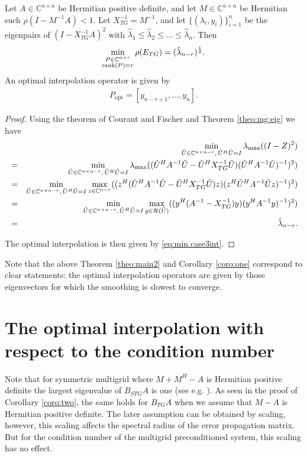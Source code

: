 \documentclass[final]{siamltex}
\newcommand{\innbCnnmr}{\in\mathbb{C}^{n\times n-r}}
\newcommand{\beqo}{\begin{eqnarray*}}
\newcommand{\beq}{\begin{eqnarray}}
\newcommand{\eeqo}{\end{eqnarray*}}
\newcommand{\eeq}{\end{eqnarray}}
\numberwithin{equation}{section}
\newcommand{\ran} {{\cal R}}
\newcommand{\bC}{\mathbb{C}}
\newcommand{\Cnr}{\mathbb{C}^{n \times r}}
\newcommand{\inCnn}{\in \mathbb{C}^{n \times n}}
\begin{document}
\begin{theorem} \label{theo:main2}
Let  $A\inCnn$  be Hermitian positive definite, and let $ M \inCnn$ be
Hermitian
such $\rho(I - M^{-1}A) < 1$.
Let $X_{TG}^{-1} =  M^{-1}$,
and let $\{(\lambda_i,y_i)\}_{i=1}^n$ be the eigenpairs of $(I -
X_{TG}^{-1}A)^2$ with $
\hat \lambda_1 \leq \hat \lambda_2 \leq \ldots \leq  \hat \lambda_n $. Then
\beq \label{eq:min.case3}
\min_{\substack{P \in \Cnr \\ \rank(P)=r}}\rho(E_{TG}) = (\hat
\lambda_{n-r})^{\frac{1}{2}}.
\eeq
An optimal interpolation operator is given by 
\beq  \label{eq:min.case3int}
P_{\mathrm{opt}} = [y_{n-r+1}, \ldots , y_n].
\eeq
\end{theorem}
\begin{proof}
Using the theorem of Courant and Fischer and Theorem \ref{theo:mg:eig} we have
\beqo
& & \min_{\tilde U \innbCnnmr, \, \tilde U^H \tilde U=I} \lambda_{\max}((I -Z)^2) \\
& = & \min_{\tilde U \innbCnnmr, \, \tilde U^H \tilde U=I}
\lambda_{\max}((\tilde U^HA^{-1}\tilde U -
\tilde
U^HX_{TG}^{-1}\tilde U) (\tilde U^HA^{-1}\tilde U)^{-1})^2)\\
& = & \min_{\tilde U \innbCnnmr, \, \tilde U^H \tilde U=I} \max_{z \in \bC
^{n-r}}  ((z^H(\tilde U^HA^{-1}\tilde U -
\tilde U^HX_{TG}^{-1}\tilde U)z) (z^H\tilde U^HA^{-1}\tilde Uz)^{-1})^2)\\
& = & \min_{\tilde U \innbCnnmr, \, \tilde U^H \tilde U=I} \max_{y \in \ran
(\tilde U)}  ((y^H(A^{-1} -
X_{TG}^{-1})y) (y^HA^{-1}y)^{-1})^2)\\
& = & \hat \lambda_{n-r}.
\eeqo
  
The optimal interpolation is then given by \eqref{eq:min.case3int}.
\end{proof}


Note that the above Theorem \ref{theo:main2} and  Corollary \ref{coro:one}
correspond to
clear statements: the optimal interpolation operators are given
by
those
eigenvectors for which the smoothing is slowest to converge.

\section{The optimal interpolation with respect to the  condition number}





Note  that for symmetric multigrid where  $M + M^H - A$ is Hermitian  positive
definite  the largest eigenvalue of
$B_{STG}A$ is one (see e.g. \cite{Not15}).  As seen in the proof of Corollary
\ref{coro:two}, the same holds  for  $B_{TG}A$ when we assume  that  $M - A$ is
Hermitian  positive definite. The later
assumption can be obtained  by scaling, however, this scaling affects the
spectral radius of the
error propagation matrix. But for the condition number of the multigrid
preconditioned system, this scaling has no effect.
\end{document}
